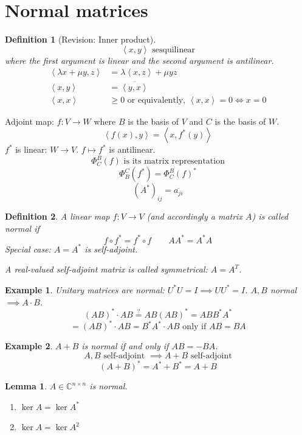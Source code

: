 \documentclass{article}
\newtheorem{example}{Example}  \numberwithin{example}{section}
\newtheorem{definition}{Definition}  \numberwithin{definition}{section}
\newtheorem{lemma}{Lemma}  \numberwithin{lemma}{section}
\newcommand{\angel}[1]{\left\langle#1\right\rangle}
\begin{document}
\section{Normal matrices} %

\begin{definition}[Revision: Inner product] %
  \[ \angel{x,y} \text{ sesquilinear} \]
  where the first argument is linear and the second argument is antilinear.
  \begin{align*}
    \angel{\lambda x + \mu y, z} &= \lambda \angel{x,z} + \mu yz \\
    \angel{x,y} &= \overline{\angel{y, x}} \\
    \angel{x,x} &\geq 0 \text{ or equivalently, } \angel{x,x} = 0 \iff x = 0
  \end{align*}
\end{definition}

Adjoint map: $f: V \to W$ where $B$ is the basis of $V$ and $C$ is the basis of $W$.
\[ \angel{f(x),y} = \angel{x,f^*(y)} \]
$f^*$ is linear: $W \to V$. $f \mapsto f^*$ is antilinear.
\[ \Phi_C^B(f) \text{ is its matrix representation} \]
\[ \Phi_B^C(f^*) = \Phi_C^B(f)^* \]
\[ (A^*)_{ij} = \overline{a_{ji}} \]

\begin{definition} %
  A linear map $f: V \to V$ (and accordingly a matrix $A$) is called \emph{normal} if
  \[ f \circ f^* = f^* \circ f \qquad A A^* = A^* A \]
  Special case: $A = A^*$ is self-adjoint.

  A real-valued self-adjoint matrix is called \emph{symmetrical}: $A = A^T$.
\end{definition}

\begin{example} %
  Unitary matrices are normal: $U^* U = I \implies U U^* = I$.
  $A, B$ normal $\implies A \cdot B$.
  \[ (AB)^* \cdot AB \overset?= AB (AB)^* = ABB^*A^* \]
  \[ = (AB)^* \cdot AB = B^* A^* \cdot  AB \text{ only if } AB = BA \]
\end{example}

\begin{example}
  $A + B$ is normal if and only if $AB = -BA$.
  \[ A,B \text{ self-adjoint } \implies A+B \text{ self-adjoint} \]
  \[ (A + B)^* = A^* + B^* = A + B \]
\end{example}

\begin{lemma} %
  $A \in \mathbb C^{n \times n}$ is normal.
  \begin{enumerate}
    \item $\ker{A} = \ker{A^*}$
    \item $\ker{A} = \ker{A^2}$
  \end{enumerate}
\end{lemma}
\end{document}
